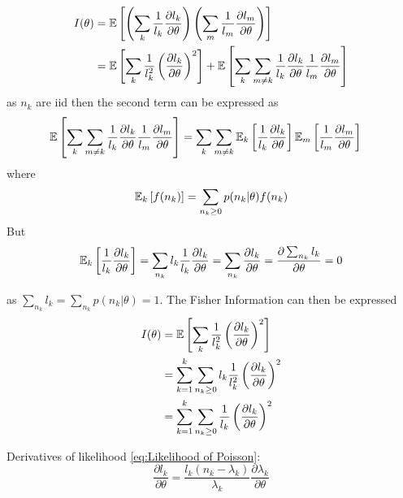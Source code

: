 \begin{alignat*}{1}
	I(\theta) 
	& =\mathbb{E}\left[\left(\sum_k\frac{1}{l_k}\frac{\partial l_k}{\partial\theta}\right)\left(\sum_{m}\frac{1}{l_{m}}\frac{\partial l_{m}}{\partial\theta}\right)\right]\\
	& =\mathbb{E}\left[\sum_k\frac{1}{l_k^2}\left(\frac{\partial l_k}{\partial\theta}\right)^2\right]+\mathbb{E}\left[\sum_k\sum_{m\neq k}\frac{1}{l_k}\frac{\partial l_k}{\partial\theta}\frac{1}{l_{m}}\frac{\partial l_{m}}{\partial\theta}\right]
\end{alignat*}
%
as $n_k$ are iid then the second term can be expressed as 
%
\begin{align*}
	\mathbb{E}\left[\sum_k\sum_{m\neq k}\frac{1}{l_k}\frac{\partial l_k}{\partial\theta}\frac{1}{l_{m}}\frac{\partial l_{m}}{\partial\theta}\right] 
	& =\sum_k\sum_{m\neq k}\mathbb{E}_k\left[\frac{1}{l_k}\frac{\partial l_k}{\partial\theta}\right]\mathbb{E}_{m}\left[\frac{1}{l_{m}}\frac{\partial l_{m}}{\partial\theta}\right]
\end{align*}
%
where
%
\begin{equation}
	\mathbb{E}_k\left[f(n_k)\right]=\sum_{n_k\geq0}p(n_k|\theta)f(n_k)
\end{equation}
%
But 
\begin{equation}
	\mathbb{E}_k\left[\frac{1}{l_k}\frac{\partial l_k}{\partial\theta}\right]=\sum_{n_k}l_k\frac{1}{l_k}\frac{\partial l_k}{\partial\theta}=\sum_{n_k}\frac{\partial l_k}{\partial\theta}=\frac{\partial\sum_{n_k}l_k}{\partial\theta}=0
\end{equation}

as $\sum_{n_k}l_k=\sum_{n_k}p(n_k|\theta)=1$. The Fisher Information can then be expressed 
%
\begin{align*}
	I(\theta) & =\mathbb{E}\left[\sum_k\frac{1}{l_k^2}\left(\frac{\partial l_k}{\partial\theta}\right)^2\right]\\
	& =\sum_{k=1}^k\sum_{n_k\geq0}l_k\frac{1}{l_k^2}\left(\frac{\partial l_k}{\partial\theta}\right)^2\\
	& =\sum_{k=1}^k\sum_{n_k\geq0}\frac{1}{l_k}\left(\frac{\partial l_k}{\partial\theta}\right)^2
\end{align*}

Derivatives of likelihood \autoref{eq:Likelihood of Poisson}: 
%
\begin{equation}
	\frac{\partial l_k}{\partial\theta}=\frac{l_k(n_k-\lambda_k)}{\lambda_k}\frac{\partial\lambda_k}{\partial\theta}
\end{equation}

